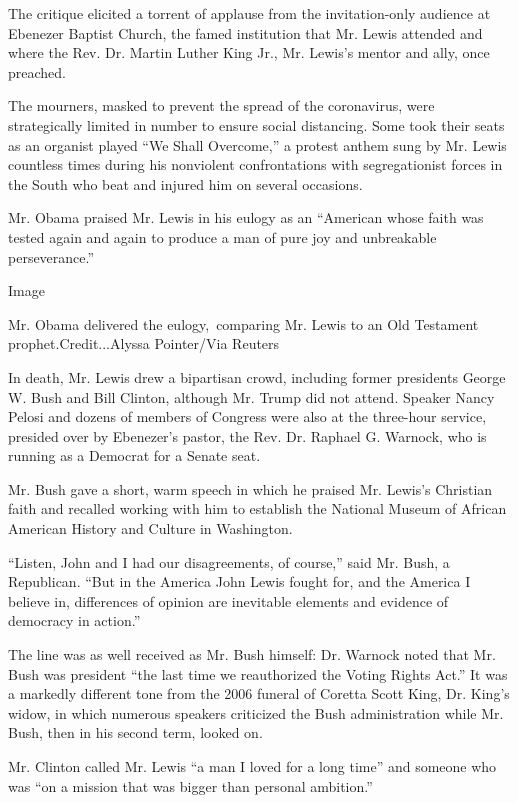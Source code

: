The critique elicited a torrent of applause from the invitation-only
audience at Ebenezer Baptist Church, the famed institution that Mr.
Lewis attended and where the Rev. Dr. Martin Luther King Jr., Mr.
Lewis's mentor and ally, once preached.

The mourners, masked to prevent the spread of the coronavirus, were
strategically limited in number to ensure social distancing. Some took
their seats as an organist played ``We Shall Overcome,'' a protest
anthem sung by Mr. Lewis countless times during his nonviolent
confrontations with segregationist forces in the South who beat and
injured him on several occasions.

Mr. Obama praised Mr. Lewis in his eulogy as an ``American whose faith
was tested again and again to produce a man of pure joy and unbreakable
perseverance.''

Image

Mr. Obama delivered the eulogy,~comparing Mr. Lewis to an Old Testament
prophet.Credit...Alyssa Pointer/Via Reuters

In death, Mr. Lewis drew a bipartisan crowd, including former presidents
George W. Bush and Bill Clinton, although Mr. Trump did not attend.
Speaker Nancy Pelosi and dozens of members of Congress were also at the
three-hour service, presided over by Ebenezer's pastor, the Rev. Dr.
Raphael G. Warnock, who is running as a Democrat for a Senate seat.

Mr. Bush gave a short, warm speech in which he praised Mr. Lewis's
Christian faith and recalled working with him to establish the National
Museum of African American History and Culture in Washington.

``Listen, John and I had our disagreements, of course,'' said Mr. Bush,
a Republican. ``But in the America John Lewis fought for, and the
America I believe in, differences of opinion are inevitable elements and
evidence of democracy in action.''

The line was as well received as Mr. Bush himself: Dr. Warnock noted
that Mr. Bush was president ``the last time we reauthorized the Voting
Rights Act.'' It was a markedly different tone from the 2006 funeral of
Coretta Scott King, Dr. King's widow, in which numerous speakers
criticized the Bush administration while Mr. Bush, then in his second
term, looked on.

Mr. Clinton called Mr. Lewis ``a man I loved for a long time'' and
someone who was ``on a mission that was bigger than personal ambition.''

